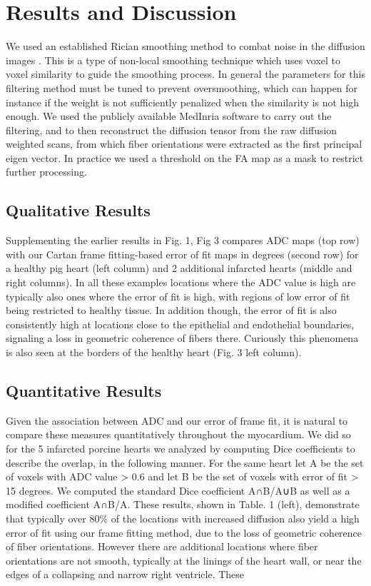 \chapter{Results and Discussion}

We used an established Rician smoothing method to combat noise in the diffusion images \cite{wiest2008rician}. This is a type of non-local smoothing technique which uses voxel to voxel similarity to guide the smoothing process. In general the parameters for this filtering method must be tuned to prevent oversmoothing, which can happen for instance if the weight is not sufficiently penalized when the similarity is not high enough. We used the publicly available MedInria software to carry out the filtering, and to then reconstruct the diffusion tensor from the raw diffusion weighted scans, from which fiber orientations were extracted as the first principal eigen vector. In practice we used a threshold on the FA map as a mask to restrict further processing.

\section{Qualitative Results}

Supplementing the earlier results in Fig. 1, Fig 3 compares ADC maps (top row) with our Cartan frame fitting-based error of fit maps in degrees (second row) for a healthy pig heart (left column) and 2 additional infarcted hearts (middle and right columns). In all these examples locations where the ADC value is high are typically also ones where the error of fit is high, with regions of low error of fit being restricted to healthy tissue. In addition though, the error of fit is also consistently high at locations close to the epithelial and endothelial boundaries, signaling a loss in geometric coherence of fibers there. Curiously this phenomena is also seen at the borders of the healthy heart (Fig. 3 left column).

\section{Quantitative Results}

Given the association between ADC and our error of frame fit, it is natural to compare these measures quantitatively throughout the myocardium. We did so for the 5 infarcted porcine hearts we analyzed by computing Dice coefficients to describe the overlap, in the following manner. For the same heart let A be the set of voxels with ADC value > 0.6 and let B be the set of voxels with error of fit > 15 degrees. We computed the standard Dice coefficient A∩B/A∪B as well as a modified coefficient A∩B/A. These results, shown in Table. 1 (left), demonstrate that typically over 80\% of the locations with increased diffusion also yield a high error of fit using our frame fitting method, due to the loss of geometric coherence of fiber orientations. However there are additional locations where fiber orientations are not smooth, typically at the linings of the heart wall, or near the edges of a collapsing and narrow right ventricle. These